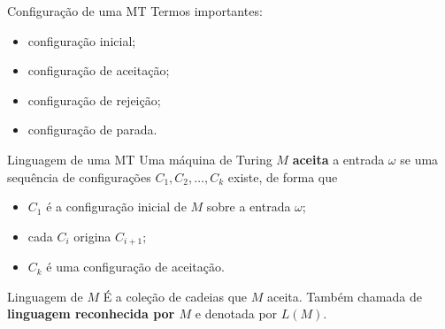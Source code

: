 \documentclass[xcolor=dvipsnames,table]{beamer}
\begin{document}
	\begin{frame}{Configuração de uma MT}
		Termos importantes:
		\begin{itemize}
			\item configuração inicial;
			\item configuração de aceitação;
			\item configuração de rejeição;
			\item configuração de parada.
		\end{itemize}
	\end{frame}
	
	\begin{frame}{Linguagem de uma MT}
		Uma máquina de Turing $M$ {\bf aceita} a entrada $\omega$ se uma sequência de configurações $C_1, C_2, \ldots, C_k$ existe, de forma que 
		\begin{itemize}
			\item $C_1$ é a configuração inicial de $M$ sobre a entrada $\omega$;
			\item cada $C_i$ origina $C_{i+1}$;
			\item $C_k$ é uma configuração de aceitação.
		\end{itemize} \pause
		
		\begin{block}{Linguagem de $M$}
			É a coleção de cadeias que $M$ aceita. Também chamada de {\bf linguagem reconhecida por $M$} e denotada por $L(M)$.
		\end{block}		
	\end{frame}
	
	\begin{frame}
		\titlepage
	\end{frame}
	
\end{document}
